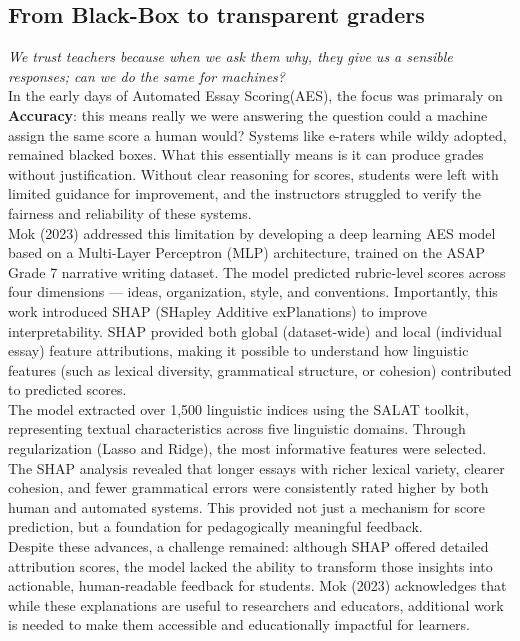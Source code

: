 \documentclass[a4paper,twoside,12pt]{report}
\begin{document}
\subsection{From Black-Box to transparent graders}
\textit{We trust teachers because when we ask them why, they give us a sensible responses; can we do the same for machines?}\\
In the early days of Automated Essay Scoring(AES), the focus was primaraly on \textbf{Accuracy}: this means
really we were answering the question could a machine assign the same score a human would?
Systems like e-raters while wildy adopted, remained blacked boxes. What this essentially means is 
it can produce grades without justification. Without clear reasoning for scores, students were left with 
limited guidance for improvement, and the instructors struggled to verify the fairness and reliability of these systems.\\
Mok (2023) addressed this limitation by developing a deep learning AES model based on a Multi-Layer Perceptron (MLP) architecture, trained on the ASAP Grade 7 narrative writing dataset. The model predicted rubric-level scores across four dimensions — ideas, organization, style, and conventions. Importantly, this work introduced SHAP (SHapley Additive exPlanations) to improve interpretability. SHAP provided both global (dataset-wide) and local (individual essay) feature attributions, making it possible to understand how linguistic features (such as lexical diversity, grammatical structure, or cohesion) contributed to predicted scores.\\
The model extracted over 1,500 linguistic indices using the SALAT toolkit, representing textual characteristics across five linguistic domains. Through regularization (Lasso and Ridge), the most informative features were selected. The SHAP analysis revealed that longer essays with richer lexical variety, clearer cohesion, and fewer grammatical errors were consistently rated higher by both human and automated systems. This provided not just a mechanism for score prediction, but a foundation for pedagogically meaningful feedback.\\
Despite these advances, a challenge remained: although SHAP offered detailed attribution scores, the model lacked the ability to transform those insights into actionable, human-readable feedback for students. Mok (2023) acknowledges that while these explanations are useful to researchers and educators, additional work is needed to make them accessible and educationally impactful for learners.\\
\end{document}
